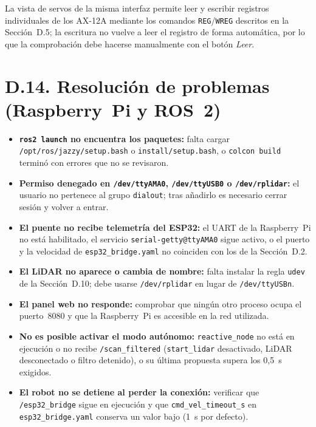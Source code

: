 La vista de servos de la misma interfaz permite leer y escribir registros
individuales de los AX-12A mediante los comandos \texttt{REG}/\texttt{WREG}
descritos en la Sección~D.5; la escritura no vuelve a leer el registro de
forma automática, por lo que la comprobación debe hacerse manualmente con el
botón \textit{Leer}.

\section*{D.14. Resolución de problemas (Raspberry~Pi y ROS~2)}

\begin{itemize}[leftmargin=*,nosep]
    \small
    \item \textbf{\texttt{ros2 launch} no encuentra los paquetes:} falta
          cargar \texttt{/opt/ros/jazzy/setup.bash} o
          \texttt{install/setup.bash}, o \texttt{colcon build} terminó con
          errores que no se revisaron.
    \item \textbf{Permiso denegado en \texttt{/dev/ttyAMA0},
          \texttt{/dev/ttyUSB0} o \texttt{/dev/rplidar}:} el usuario no
          pertenece al grupo \texttt{dialout}; tras añadirlo es necesario
          cerrar sesión y volver a entrar.
    \item \textbf{El puente no recibe telemetría del ESP32:} el UART de la
          Raspberry~Pi no está habilitado, el servicio
          \texttt{serial-getty@ttyAMA0} sigue activo, o el puerto y la
          velocidad de \texttt{esp32\_bridge.yaml} no coinciden con los de la
          Sección~D.2.
    \item \textbf{El LiDAR no aparece o cambia de nombre:} falta instalar la
          regla \texttt{udev} de la Sección~D.10; debe usarse
          \texttt{/dev/rplidar} en lugar de \texttt{/dev/ttyUSBn}.
    \item \textbf{El panel web no responde:} comprobar que ningún otro
          proceso ocupa el puerto~8080 y que la Raspberry~Pi es accesible en
          la red utilizada.
    \item \textbf{No es posible activar el modo autónomo:}
          \texttt{reactive\_node} no está en ejecución o no recibe
          \texttt{/scan\_filtered} (\texttt{start\_lidar} desactivado, LiDAR
          desconectado o filtro detenido), o su última propuesta supera los
          0,5~s exigidos.
    \item \textbf{El robot no se detiene al perder la conexión:} verificar
          que \texttt{/esp32\_bridge} sigue en ejecución y que
          \texttt{cmd\_vel\_timeout\_s} en \texttt{esp32\_bridge.yaml}
          conserva un valor bajo (1~s por defecto).
\end{itemize}
